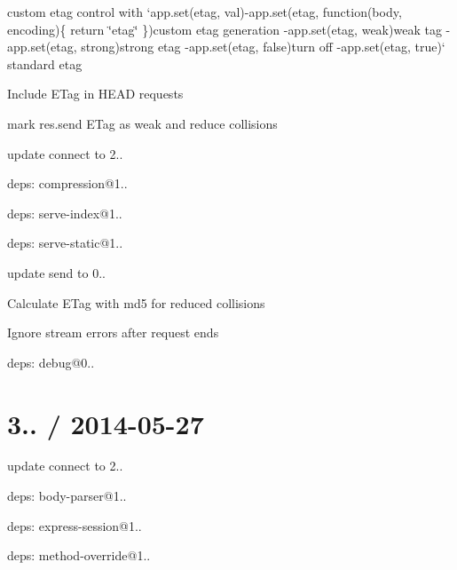 \begin{DoxyItemize}
\item custom etag control with `app.set(\textquotesingle{}etag\textquotesingle{}, val){\ttfamily  -\/}app.\+set(\textquotesingle{}etag\textquotesingle{}, function(body, encoding)\{ return \textquotesingle{}\char`\"{}etag\char`\"{}\textquotesingle{} \}){\ttfamily custom etag generation -\/}app.\+set(\textquotesingle{}etag\textquotesingle{}, \textquotesingle{}weak\textquotesingle{}){\ttfamily weak tag -\/}app.\+set(\textquotesingle{}etag\textquotesingle{}, \textquotesingle{}strong\textquotesingle{}){\ttfamily strong etag -\/}app.\+set(\textquotesingle{}etag\textquotesingle{}, false){\ttfamily turn off -\/}app.\+set(\textquotesingle{}etag\textquotesingle{}, true)` standard etag
\item Include E\+Tag in H\+E\+A\+D requests
\item mark {\ttfamily res.\+send} E\+Tag as weak and reduce collisions
\item update connect to 2..
\begin{DoxyItemize}
\item deps\+: compression@1..
\item deps\+: serve-\/index@1..
\item deps\+: serve-\/static@1..
\end{DoxyItemize}
\item update send to 0..
\begin{DoxyItemize}
\item Calculate E\+Tag with md5 for reduced collisions
\item Ignore stream errors after request ends
\item deps\+: debug@0..
\end{DoxyItemize}
\end{DoxyItemize}

\section*{3.. / 2014-\/05-\/27 }


\begin{DoxyItemize}
\item update connect to 2..
\begin{DoxyItemize}
\item deps\+: body-\/parser@1..
\item deps\+: express-\/session@1..
\item deps\+: method-\/override@1..
\end{DoxyItemize}
\end{DoxyItemize}

